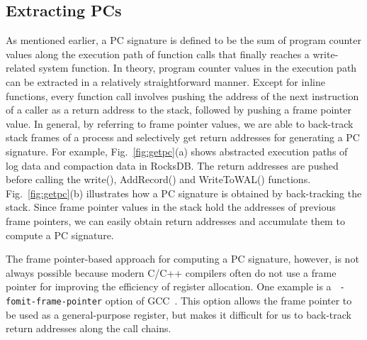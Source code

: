 \subsection{Extracting PCs}
As mentioned earlier, a PC signature is defined to be the sum of program counter
values along the execution path of function calls that finally reaches a
write-related system function.  
In theory, program counter values in the
execution path can be extracted in a relatively straightforward manner.  Except
for inline functions, every function call involves pushing the address of the
next instruction of a caller as a return address to the stack, followed by
pushing a frame pointer value.  In general, by referring to frame pointer
values, we are able to back-track stack frames of a process and selectively get
return addresses for generating a PC signature.  For example,
Fig.~\ref{fig:getpc}(a) shows abstracted execution paths of log data and 
compaction data in RocksDB.
The return addresses are pushed before calling the
\textsf{\small  write()}, \textsf{\small AddRecord()} and \textsf{\small
WriteToWAL()} functions. 
Fig.~\ref{fig:getpc}(b) illustrates how a 
PC signature is obtained
by back-tracking the stack.  Since frame pointer values in the stack hold
the addresses of previous frame pointers, we can easily obtain return addresses
and accumulate them to compute a PC signature.  

The frame pointer-based approach for computing a PC signature, however, is not
always possible because modern C/C++ compilers often do not use a frame pointer
for improving the efficiency of register allocation.  One example is a {\tt
-fomit-frame-pointer} option of GCC~\cite{GCC}.  This option allows the frame
pointer to be used as a general-purpose register, but makes it difficult for us
to back-track return addresses along the call chains.  

